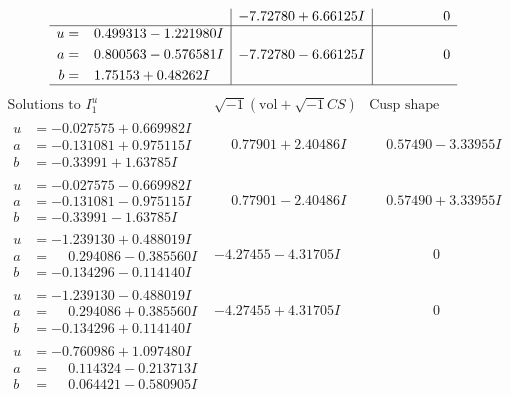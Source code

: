 \documentclass[1p]{elsarticle_modified}
\theoremstyle{definition}
\newcommand{\I}{\sqrt{-1}}
\begin{document}
$$\begin{array}{c|c|c}
 & -7.72780 + 6.66125 I & \phantom{-0.000000 } 0 \\ \hline\begin{aligned}
u &= \phantom{-}0.499313 - 1.221980 I \\
a &= \phantom{-}0.800563 - 0.576581 I \\
b &= \phantom{-}1.75153 + 0.48262 I\end{aligned}
 & -7.72780 - 6.66125 I & \phantom{-0.000000 } 0\\
 \hline 
 \end{array}$$\newpage$$\begin{array}{c|c|c}  
\text{Solutions to }I^u_{1}& \I (\text{vol} + \sqrt{-1}CS) & \text{Cusp shape}\\
 \hline 
\begin{aligned}
u &= -0.027575 + 0.669982 I \\
a &= -0.131081 + 0.975115 I \\
b &= -0.33991 + 1.63785 I\end{aligned}
 & \phantom{-}0.77901 + 2.40486 I & \phantom{-}0.57490 - 3.33955 I \\ \hline\begin{aligned}
u &= -0.027575 - 0.669982 I \\
a &= -0.131081 - 0.975115 I \\
b &= -0.33991 - 1.63785 I\end{aligned}
 & \phantom{-}0.77901 - 2.40486 I & \phantom{-}0.57490 + 3.33955 I \\ \hline\begin{aligned}
u &= -1.239130 + 0.488019 I \\
a &= \phantom{-}0.294086 - 0.385560 I \\
b &= -0.134296 - 0.114140 I\end{aligned}
 & -4.27455 - 4.31705 I & \phantom{-0.000000 } 0 \\ \hline\begin{aligned}
u &= -1.239130 - 0.488019 I \\
a &= \phantom{-}0.294086 + 0.385560 I \\
b &= -0.134296 + 0.114140 I\end{aligned}
 & -4.27455 + 4.31705 I & \phantom{-0.000000 } 0 \\ \hline\begin{aligned}
u &= -0.760986 + 1.097480 I \\
a &= \phantom{-}0.114324 - 0.213713 I \\
b &= \phantom{-}0.064421 - 0.580905 I\end{aligned}

\end{array}$$
\end{document}
